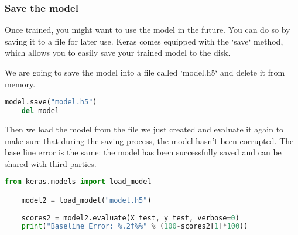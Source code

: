 \subsubsection{Save the model}

Once trained, you might want to use the model in the future. You can do so by saving it to a file for later use. Keras comes equipped with the `save` method, which allows you to easily save your trained model to the disk.

We are going to save the model into a file called `model.h5` and delete it from memory.

\begin{lstlisting}[language=Python]
    model.save("model.h5")
    del model    
\end{lstlisting}

Then we load the model from the file we just created and evaluate it again to make sure that during the saving process, the model hasn't been corrupted. The base line error is the same: the model has been successfully saved and can be shared with third-parties. 

\begin{lstlisting}[language=Python]
    from keras.models import load_model

    model2 = load_model("model.h5")
    
    scores2 = model2.evaluate(X_test, y_test, verbose=0)
    print("Baseline Error: %.2f%%" % (100-scores2[1]*100))    
\end{lstlisting}
